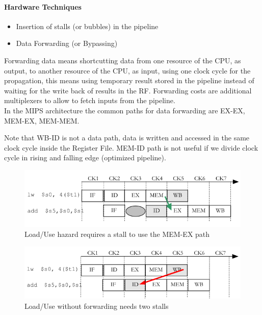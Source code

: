 \paragraph{Hardware Techniques}
\begin{itemize}
    \item[\textrightarrow] Insertion of stalls (or bubbles) in the pipeline
    \item[\textrightarrow] Data Forwarding (or Bypassing)
\end{itemize}

Forwarding data means shortcutting data from one resource of the CPU, as output, to another resource of the CPU, as
input, using one clock cycle for the propagation, this means using temporary result stored in the pipeline instead of
waiting for the write back of results in the RF\@.
Forwarding costs are additional multiplexers to allow to fetch inputs from the pipeline.\\
In the MIPS architecture the common paths for data forwarding are EX-EX, MEM-EX, MEM-MEM\@.

Note that WB-ID is not a data path, data is written and accessed in the same clock cycle inside the Register File.
MEM-ID path is not useful if we divide clock cycle in rising and falling edge (optimized pipeline).


\begin{figure}[h]
    \centering
    \includegraphics[scale=0.4]{images/load-use-hazard}
    \caption{Load/Use hazard requires a stall to use the MEM-EX path}
    \label{fig:load-use-hazard}
\end{figure}


\begin{figure}[h]
    \centering
    \includegraphics[scale=0.4]{images/load-use-without-forwarding}
    \caption{Load/Use without forwarding needs two stalls}
    \label{fig:load-use-without-forwarding}
\end{figure}


